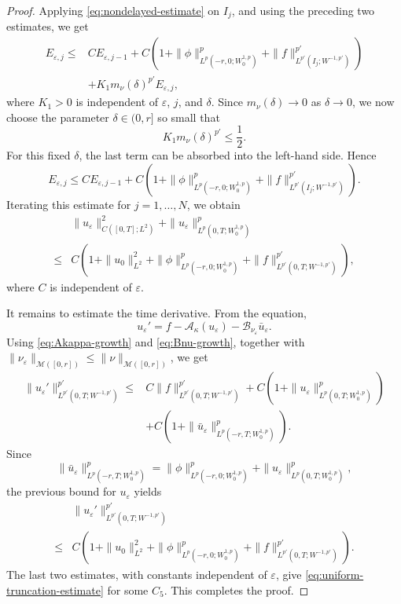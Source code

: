 \documentclass[a4paper,11pt,oneside,reqno]{amsart}
\newcounter{c}
\newcounter{d}
\newcounter{b}
\newcommand{\e}{\varepsilon}
\newcommand{\M}{\mathcal{M}}
\begin{document}
\begin{proof}
Applying \eqref{eq:nondelayed-estimate} on \(I_j\), and using the preceding
two estimates, we get
\[
\begin{aligned}
 E_{\e,j}
 \le{}&
 C E_{\e,j-1}
 +C\left(
 1+\|\phi\|_{L^p(-r,0;W^{1,p}_0)}^p
 +\|f\|_{L^{p'}(I_j;W^{-1,p'})}^{p'}
 \right) \\
 &+
 K_1 m_\nu(\delta)^{p'} E_{\e,j},
\end{aligned}
\]
where \(K_1>0\) is independent of \(\e\), \(j\), and \(\delta\). Since
\(m_\nu(\delta)\to0\) as \(\delta\to0\), we now choose the parameter
\(\delta\in(0,r]\) so small that
\[
 K_1m_\nu(\delta)^{p'}\le \frac12 .
\]
For this fixed \(\delta\), the last term can be absorbed into the left-hand
side. Hence
\[
 E_{\e,j}
 \le
 C E_{\e,j-1}
 +C\left(
 1+\|\phi\|_{L^p(-r,0;W^{1,p}_0)}^p
 +\|f\|_{L^{p'}(I_j;W^{-1,p'})}^{p'}
 \right).
\]
Iterating this estimate for \(j=1,\dots,N\), we obtain
\[
\begin{aligned}
 &\|u_\e\|_{C([0,T];L^2)}^2
 +\|u_\e\|_{L^p(0,T;W^{1,p}_0)}^p \\
 \le{}&
 C\left(
 1+\|u_0\|_{L^2}^2
 +\|\phi\|_{L^p(-r,0;W^{1,p}_0)}^p
 +\|f\|_{L^{p'}(0,T;W^{-1,p'})}^{p'}
 \right),
\end{aligned}
\]
where \(C\) is independent of \(\e\).

It remains to estimate the time derivative.  From the equation,
\[
 u_\e'
 =
 f-\mathcal A_\kappa(u_\e)
  -\mathcal B_{\nu_\e}\bar u_\e .
\]
Using \eqref{eq:Akappa-growth} and \eqref{eq:Bnu-growth}, together with
\(\|\nu_\e\|_{\M([0,r])}\le\|\nu\|_{\M([0,r])}\), we get
\[
\begin{aligned}
 \|u_\e'\|_{L^{p'}(0,T;W^{-1,p'})}^{p'}
 \le{}&
 C\|f\|_{L^{p'}(0,T;W^{-1,p'})}^{p'}
 +C\left(
  1+\|u_\e\|_{L^p(0,T;W^{1,p}_0)}^p
 \right) \\
 &+
 C\left(
  1+\|\bar u_\e\|_{L^p(-r,T;W^{1,p}_0)}^p
 \right).
\end{aligned}
\]
Since
\[
 \|\bar u_\e\|_{L^p(-r,T;W^{1,p}_0)}^p
 =
 \|\phi\|_{L^p(-r,0;W^{1,p}_0)}^p
 +
 \|u_\e\|_{L^p(0,T;W^{1,p}_0)}^p,
\]
the previous bound for \(u_\e\) yields
\[
\begin{aligned}
 &\|u_\e'\|_{L^{p'}(0,T;W^{-1,p'})}^{p'}\\
 \le{}&
 C\left(
 1+\|u_0\|_{L^2}^2
 +\|\phi\|_{L^p(-r,0;W^{1,p}_0)}^p  
 +\|f\|_{L^{p'}(0,T;W^{-1,p'})}^{p'}
 \right).
\end{aligned}
\]
The last two estimates, with constants independent of \(\e\), give
\eqref{eq:uniform-truncation-estimate} for some \(C_5\).  This completes the
proof.
\end{proof}
\end{document}
